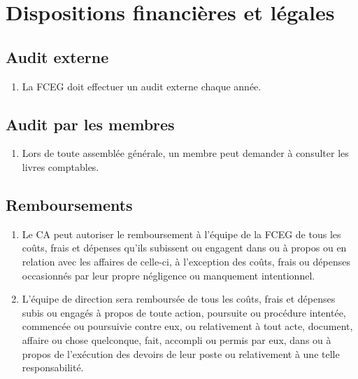 \section{Dispositions financières et légales}
\label{dispositions-financieres-et-legales}

\subsection{Audit externe}
\label{dispositions-financieres-et-legales-audit-externe}

\begin{enumerate}
 \item La FCEG doit effectuer un audit externe chaque année.
\end{enumerate}

\subsection{Audit par les membres}
\label{dispositions-financieres-et-legales-audit-par-les-membres}

\begin{enumerate}
 \item Lors de toute assemblée générale, un membre peut demander à consulter les livres comptables.
\end{enumerate}

\subsection{Remboursements}
\label{dispositions-financieres-et-legales-remboursements}

\begin{enumerate}
 \item Le CA peut autoriser le remboursement à l'équipe de la FCEG de tous les coûts, frais et dépenses qu'ils subissent ou engagent dans ou à propos ou en relation avec les affaires de celle-ci, à l'exception des coûts, frais ou dépenses occasionnés par leur propre négligence ou manquement intentionnel.
 \item L'équipe de direction sera remboursée de tous les coûts, frais et dépenses subis ou engagés à propos de toute action, poursuite ou procédure intentée, commencée ou poursuivie contre eux, ou relativement à tout acte, document, affaire ou chose quelconque, fait, accompli ou permis par eux, dans ou à propos de l'exécution des devoirs de leur poste ou relativement à une telle responsabilité.
\end{enumerate}

